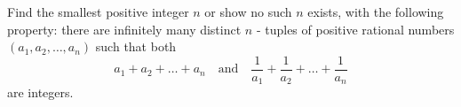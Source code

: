 Find the smallest positive integer 
$n$
 or show no such 
$n$
 exists, with the following property: there are infinitely many distinct 
$n$
-
tuples of positive rational numbers 
$(a_1, a_2, \ldots, a_n)$
 such that both
$$a_1+a_2+\dots +a_n \quad \text{and} \quad \frac{1}{a_1} + \frac{1}{a_2} + \dots + \frac{1}{a_n}$$
are integers.

